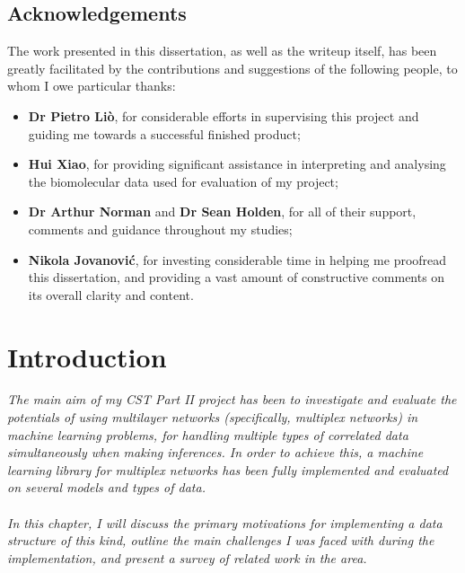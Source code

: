 \documentclass[12pt,a4paper,twoside,openright]{report}
\begin{document}
\bigskip
{}

\medskip
{}

\tableofcontents


\newpage
\section*{Acknowledgements}

The work presented in this dissertation, as well as the writeup itself, has been greatly facilitated by the contributions and suggestions of the following people, to whom I owe particular thanks:
\begin{itemize}
	\item {\bf Dr Pietro Li\`{o}}, for considerable efforts in supervising this project and guiding me towards a successful finished product; 
	\item {\bf Hui Xiao}, for providing significant assistance in interpreting and analysing the biomolecular data used for evaluation of my project;
	\item {\bf Dr Arthur Norman} and {\bf Dr Sean Holden}, for all of their support, comments and guidance throughout my studies;
	\item {\bf Nikola Jovanovi\'c}, for investing considerable time in helping me proofread this dissertation, and providing a vast amount of constructive comments on its overall clarity and content.
\end{itemize}


\pagestyle{headings}
\thispagestyle{plain}

\chapter{Introduction}

\emph{The main aim of my CST Part II project has been to investigate and evaluate the potentials of using multilayer networks (specifically, multiplex networks) in machine learning problems, for handling multiple types of correlated data simultaneously when making inferences. In order to achieve this, a machine learning library for multiplex networks has been fully implemented and evaluated on several models and types of data.\\ \\
	In this chapter, I will discuss the primary motivations for implementing a data structure of this kind, outline the main challenges I was faced with during the implementation, and present a survey of related work in the area.}
\end{document}
